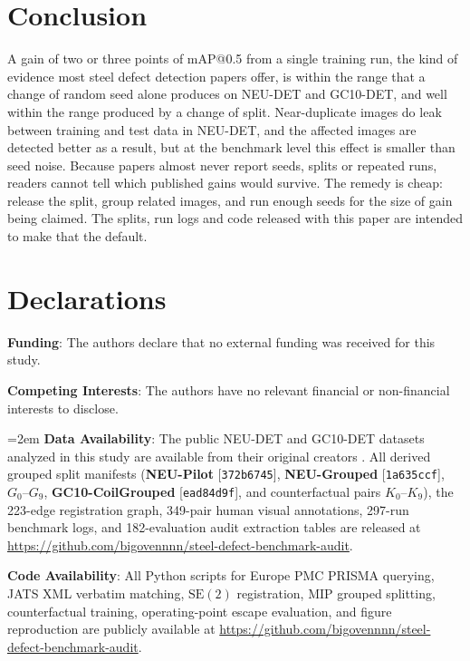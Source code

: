\documentclass[pdflatex,sn-apa]{sn-jnl}
\begin{document}
\section{Conclusion}\label{sec:conclusion}

A gain of two or three points of mAP@0.5 from a single training run, the kind of evidence most steel defect detection papers offer, is within the range that a change of random seed alone produces on NEU-DET and GC10-DET, and well within the range produced by a change of split. Near-duplicate images do leak between training and test data in NEU-DET, and the affected images are detected better as a result, but at the benchmark level this effect is smaller than seed noise. Because papers almost never report seeds, splits or repeated runs, readers cannot tell which published gains would survive. The remedy is cheap: release the split, group related images, and run enough seeds for the size of gain being claimed. The splits, run logs and code released with this paper are intended to make that the default.

\backmatter

\section*{Declarations}

\noindent\textbf{Funding}: The authors declare that no external funding was received for this study.

\vspace{0.4em}
\noindent\textbf{Competing Interests}: The authors have no relevant financial or non-financial interests to disclose.

\vspace{0.4em}
{\emergencystretch=2em
\noindent\textbf{Data Availability}: The public NEU-DET and GC10-DET datasets analyzed in this study are available from their original creators \citep{song2013neu,he2020neu,lv2020gc10}. All derived grouped split manifests (\textbf{NEU-Pilot} [\texttt{372b6745}], \textbf{NEU-Grouped} [\texttt{1a635ccf}], $G_0$--$G_9$, \textbf{GC10-CoilGrouped} [\texttt{ead84d9f}], and counterfactual pairs $K_0$--$K_9$), the 223-edge registration graph, 349-pair human visual annotations, 297-run benchmark logs, and 182-evaluation audit extraction tables are released at \url{https://github.com/bigovennnn/steel-defect-benchmark-audit}.\par}

\vspace{0.4em}
\noindent\textbf{Code Availability}: All Python scripts for Europe PMC PRISMA querying, JATS XML verbatim matching, $\mathrm{SE}(2)$ registration, MIP grouped splitting, counterfactual training, operating-point escape evaluation, and figure reproduction are publicly available at \url{https://github.com/bigovennnn/steel-defect-benchmark-audit}.
\end{document}
